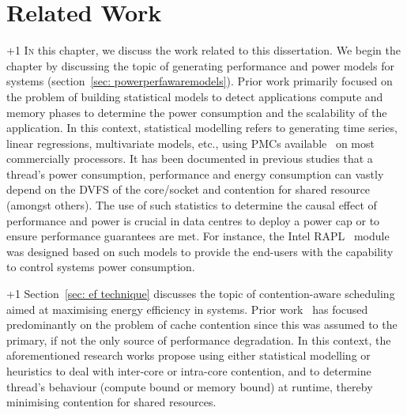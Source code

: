 \chapter{Related Work}
\label{chap: relatedwork}


\looseness +1 \lettrine{I}{n} this chapter, we discuss the work related to this
dissertation.  We begin the chapter by discussing the topic of generating performance and
power models for \muc systems (section~\ref{sec: powerperfawaremodels}). Prior work
primarily focused on the problem of building statistical models to detect applications
compute and memory phases to determine the power consumption and the scalability of the
application. In this context, statistical modelling refers to generating time series,
linear regressions, multivariate models, etc., using PMCs
available~\citep{Petrucci:2012:LSE:2387869.2387876, Su:2014:POP:2742155.2742200,
Bellosa:2000:BED:566726.566736, Lewis:2010:CAP:1924920.1924929,
Srinivasan:2011:EIO:1945023.1945032, Rethinagiri:2014:SPE:2555486.2555491, 1598119,
4838819, Patki:2013:EHO:2464996.2465009} on most commercially processors.  It has been
documented in previous studies that a thread's power consumption, performance and energy
consumption can vastly depend on the DVFS of the core/socket and contention for shared
resource (amongst others).  The use of such statistics to determine the causal effect of
performance and power is crucial in data centres to deploy a power cap or to ensure
performance guarantees are met.  For instance, the Intel RAPL~\citep{6270741} module was
designed based on such models to provide the end-users with the capability to control
systems power consumption. 

\looseness +1 Section~\ref{sec: ef technique} discusses the topic of contention-aware
scheduling aimed at maximising energy efficiency in \muc systems.  Prior
work~\citep{Nishtala:2013:ETC:2555754.2555775, Zhuravlev:2013:SES:2498743.2498946,
Blagodurov:2010:CSM:1880018.1880019, Zhuravlev:2012:SST:2379776.2379780,
Fedorova:2007:IPI:1299042.1299108, Knauerhase:2008:UOO:1435611.1436101,
Tam:2007:TCS:1272996.1273004, Tam:2009:RAL:1508284.1508259} has focused predominantly on
the problem of cache contention since this was assumed to the primary, if not the only
source of performance degradation.  In this context, the aforementioned research works
propose using either statistical modelling or heuristics to deal with inter-core or
intra-core contention, and to determine thread's behaviour (compute bound or memory bound)
at runtime, thereby minimising contention for shared resources.

